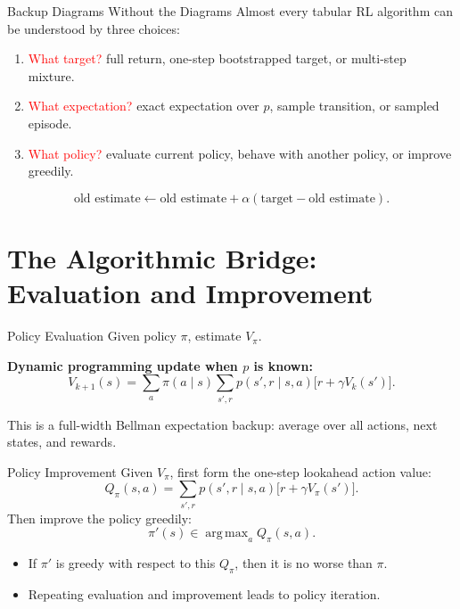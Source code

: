 \documentclass[aspectratio=169]{beamer}
\newcommand{\red}[1]{\textcolor{red}{#1}}
\DeclareMathOperator*{\argmax}{arg\,max}
\begin{document}
\begin{frame}{Backup Diagrams Without the Diagrams}
\small
Almost every tabular RL algorithm can be understood by three choices:

\begin{enumerate}
    \item \red{What target?} full return, one-step bootstrapped target, or multi-step mixture.
    \item \red{What expectation?} exact expectation over $p$, sample transition, or sampled episode.
    \item \red{What policy?} evaluate current policy, behave with another policy, or improve greedily.
\end{enumerate}

\vspace{0.8em}
\[
\text{old estimate} \leftarrow
\text{old estimate}+\alpha(\text{target}-\text{old estimate}).
\]
\end{frame}

\section{The Algorithmic Bridge: Evaluation and Improvement}

\begin{frame}{Policy Evaluation}
\small
Given policy $\pi$, estimate $V_\pi$.

\vspace{0.5em}
\textbf{Dynamic programming update when $p$ is known:}
\[
V_{k+1}(s)=
\sum_a \pi(a\mid s)\sum_{s',r}p(s',r\mid s,a)
\bigl[r+\gamma V_k(s')\bigr].
\]

\vspace{0.7em}
This is a full-width Bellman expectation backup: average over all actions, next states, and rewards.
\end{frame}

\begin{frame}{Policy Improvement}
\small
Given $V_\pi$, first form the one-step lookahead action value:
\[
Q_\pi(s,a)=\sum_{s',r}p(s',r\mid s,a)\bigl[r+\gamma V_\pi(s')\bigr].
\]
Then improve the policy greedily:
\[
\pi'(s)\in\argmax_a Q_\pi(s,a).
\]

\vspace{0.7em}
\begin{itemize}
    \item If $\pi'$ is greedy with respect to this $Q_\pi$, then it is no worse than $\pi$.
    \item Repeating evaluation and improvement leads to policy iteration.
\end{itemize}
\end{frame}
\end{document}
